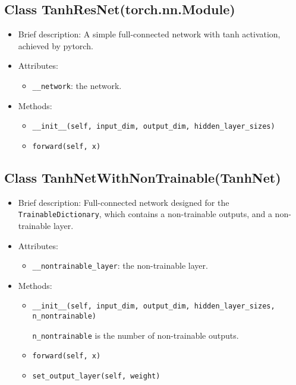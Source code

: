 \subsection{Class TanhResNet(torch.nn.Module)}

\begin{itemize}
\item Brief description: A simple full-connected network with tanh activation,
  achieved by pytorch.
\item Attributes:
  \begin{itemize}
  \item \lstinline|__network|: the network.
  \end{itemize}
\item Methods:
  \begin{itemize}
  \item \lstinline|__init__(self, input_dim, output_dim, hidden_layer_sizes)|
  \item \lstinline|forward(self, x)|
  \end{itemize}
\end{itemize}

\subsection{Class TanhNetWithNonTrainable(TanhNet)}

\begin{itemize}
\item Brief description: Full-connected network designed for the 
  \lstinline|TrainableDictionary|,
  which contains a non-trainable outputs,
  and a non-trainable layer.
\item Attributes:
  \begin{itemize}
  \item \lstinline|__nontrainable_layer|: the non-trainable layer.
  \end{itemize}
\item Methods:
  \begin{itemize}
  \item \lstinline|__init__(self, input_dim, output_dim, hidden_layer_sizes, n_nontrainable)|

    \lstinline|n_nontrainable| is the number of non-trainable outputs.
  \item \lstinline|forward(self, x)|
  \item \lstinline|set_output_layer(self, weight)|
  \end{itemize}
\end{itemize}

